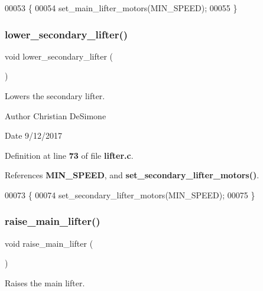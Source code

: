 \begin{DoxyCode}
00053                         \{
00054   set_main_lifter_motors(MIN_SPEED);
00055 \}
\end{DoxyCode}
\mbox{\label{lifter_8c_af76abbd394bf206ab56fa237d776f2b3}} 
\subsubsection{lower\+\_\+secondary\+\_\+lifter()}
{\footnotesize\ttfamily void lower\+\_\+secondary\+\_\+lifter (\begin{DoxyParamCaption}{ }\end{DoxyParamCaption})}



Lowers the secondary lifter. 

\begin{DoxyAuthor}{Author}
Christian De\+Simone 
\end{DoxyAuthor}
\begin{DoxyDate}{Date}
9/12/2017 
\end{DoxyDate}


Definition at line \textbf{ 73} of file \textbf{ lifter.\+c}.



References \textbf{ M\+I\+N\+\_\+\+S\+P\+E\+ED}, and \textbf{ set\+\_\+secondary\+\_\+lifter\+\_\+motors()}.


\begin{DoxyCode}
00073                              \{
00074   set_secondary_lifter_motors(MIN_SPEED);
00075 \}
\end{DoxyCode}
\mbox{\label{lifter_8c_a2e2bd38b5b8b52378f3510368bf8aa0a}} 
\subsubsection{raise\+\_\+main\+\_\+lifter()}
{\footnotesize\ttfamily void raise\+\_\+main\+\_\+lifter (\begin{DoxyParamCaption}{ }\end{DoxyParamCaption})}



Raises the main lifter. 


